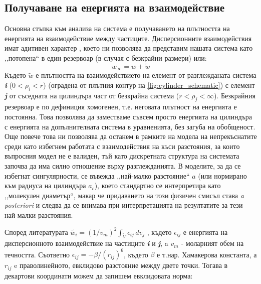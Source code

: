 \subsection{Получаване на енергията на взаимодействие}
Основна стъпка към анализа на система е получаването на плътността на енергията на взаимодействие между частиците.
Дисперсионните взаимодействия имат адитивен характер \cite{israelachvili}, което ни позволява да представим нашата система като
,,потопена`` в един резервоар (в случая с безкрайни размери) или:
\begin{equation}
	w_{\infty}  = w + \tilde{w}
\end{equation}
Където $\tilde{w}$ е плътността на взаимодействието на елемент от разглежданата система \textbf{\textit{i}} ($0 < \rho_{i} < r$) (оградена от плътния контур на \autoref{fig:cylinder_schematic}) с елемент \textbf{\textit{j}} от съседната на цилиндъра част от безкрайна система ($r < \rho_{j} <  \infty$).
Безкрайния резервоар е по дефиниция хомогенен, т.е. неговата плътност на енергията е постоянна. Това позволява да заместваме съвсем просто енергията на цилиндъра с енергията на допълнителната система в уравненията, без загуба на обобщеност.
Още повече това ни позволява да останем в рамките на модела на непрекъснатите среди като избегнем работата с взаимодействия на къси разстояния, за които въпросния модел не е валиден, тъй като дискретната структура на системата започва да има силно отношение върху разглежданията.
В моделите, за да се избегнат сингулярности, се въвежда ,,най-малко разстояние`` $a$ (или нормирано към радиуса на цилиндъра $a_{c}$),
което стандартно се интерпретира като ,,молекулен диаметър``, макар че придаването на този физичен смисъл става \textit{a posteriori} \cite{israelachvili} и следва да се внимава
при интерпретацията на резултатите за тези най-малки разстояния.


Според литературата  $\tilde{w_{i}} = (1/v_{m})^2 \int_{\tilde{V}}\epsilon_{ij}\,dv_{j}$ \cite{israelachvili}, където $\epsilon_{ij}$ е енергията на дисперсионното взаимодействие на частиците \textbf{\textit{i}} и \textbf{\textit{j}}, a $v_{m}$ - моларният обем на течността.
Съответно $\epsilon_{ij} = -\beta/(r_{ij})^6$, където $\beta$ е т.нар. Хамакерова константа, а $r_{ij}$ e праволинейното, евклидово разстояние между двете точки.
Тогава в декартови координати можем да запишем евклидовата норма:

